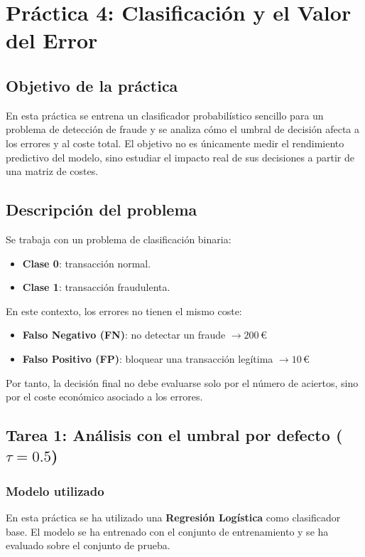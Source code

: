 \documentclass[12pt,oneside]{book}
\begin{document}
\section{Práctica 4: Clasificación y el Valor del Error}

\subsection{Objetivo de la práctica}
En esta práctica se entrena un clasificador probabilístico sencillo para un problema de detección de fraude y se analiza cómo el umbral de decisión afecta a los errores y al coste total. El objetivo no es únicamente medir el rendimiento predictivo del modelo, sino estudiar el impacto real de sus decisiones a partir de una matriz de costes.

\subsection{Descripción del problema}
Se trabaja con un problema de clasificación binaria:
\begin{itemize}
    \item \textbf{Clase 0}: transacción normal.
    \item \textbf{Clase 1}: transacción fraudulenta.
\end{itemize}

En este contexto, los errores no tienen el mismo coste:
\begin{itemize}
    \item \textbf{Falso Negativo (FN)}: no detectar un fraude \(\rightarrow 200\,€\)
    \item \textbf{Falso Positivo (FP)}: bloquear una transacción legítima \(\rightarrow 10\,€\)
\end{itemize}

Por tanto, la decisión final no debe evaluarse solo por el número de aciertos, sino por el coste económico asociado a los errores.

\subsection{Tarea 1: Análisis con el umbral por defecto (\(\tau = 0.5\))}

\subsubsection{Modelo utilizado}
En esta práctica se ha utilizado una \textbf{Regresión Logística} como clasificador base. El modelo se ha entrenado con el conjunto de entrenamiento y se ha evaluado sobre el conjunto de prueba.
\end{document}
